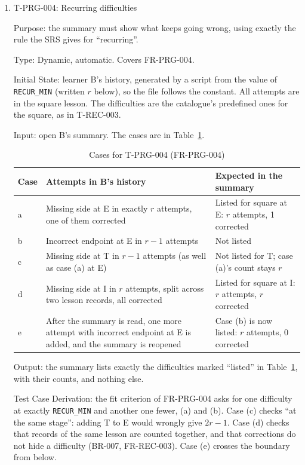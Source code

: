 \documentclass[12pt, titlepage]{article}
\newcommand{\testitem}[1]{\item #1\par\nopagebreak}
\begin{document}
\begin{enumerate}
\testitem{T-PRG-004: Recurring difficulties}

Purpose: the summary must show what keeps going wrong, using exactly the
rule the SRS gives for ``recurring''.

Type: Dynamic, automatic. Covers FR-PRG-004.

Initial State: learner B's history, generated by a script from the value of
\texttt{RECUR\_MIN} (written $r$ below), so the file follows the constant.
All attempts are in the square lesson. The difficulties are the catalogue's
predefined ones for the square, as in T-REC-003.

Input: open B's summary. The cases are in Table~\ref{tab:t-prg-004}.

\begin{table}[htbp]
\centering\small
\caption{Cases for T-PRG-004 (FR-PRG-004)}
\label{tab:t-prg-004}
\begin{tabularx}{\textwidth}{@{}l >{\raggedright\arraybackslash}X
  >{\raggedright\arraybackslash}X@{}}
\toprule
\textbf{Case} & \textbf{Attempts in B's history} & \textbf{Expected in the
summary}\\
\midrule
a & Missing side at E in exactly $r$ attempts, one of them corrected &
Listed for square at E: $r$ attempts, 1 corrected\\
b & Incorrect endpoint at E in $r - 1$ attempts & Not listed\\
c & Missing side at T in $r - 1$ attempts (as well as case (a) at E) & Not
listed for T; case (a)'s count stays $r$\\
d & Missing side at I in $r$ attempts, split across two lesson records,
all corrected & Listed for square at I: $r$ attempts, $r$ corrected\\
e & After the summary is read, one more attempt with incorrect endpoint at E
is added, and the summary is reopened & Case (b) is now listed: $r$
attempts, 0 corrected\\
\bottomrule
\end{tabularx}
\end{table}

Output: the summary lists exactly the difficulties marked ``listed'' in
Table~\ref{tab:t-prg-004}, with their counts, and nothing else.

Test Case Derivation: the fit criterion of FR-PRG-004 asks for one
difficulty at exactly \texttt{RECUR\_MIN} and another one fewer, (a) and
(b). Case (c) checks ``at the same stage'': adding T to E would wrongly give
$2r - 1$. Case (d) checks that records of the same lesson are counted
together, and that corrections do not hide a difficulty (BR-007,
FR-REC-003). Case (e) crosses the boundary from below.


\end{enumerate}
\end{document}
